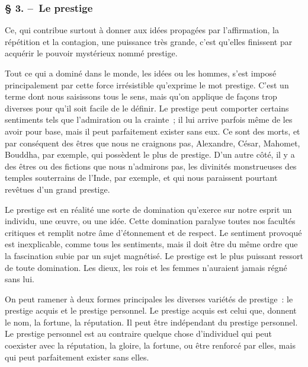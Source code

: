 \documentclass[french,twoside]{book} %
\begin{document}
\subsubsection[{§ 3. – Le prestige}]{§ 3. – Le prestige}
\noindent Ce, qui contribue surtout à donner aux idées propagées par l’affirmation, la répéti­tion et la contagion, une puissance très grande, c’est qu’elles finissent par acquérir le pouvoir mystérieux nommé prestige.\par
Tout ce qui a dominé dans le monde, les idées ou les hommes, s’est imposé principalement par cette force irrésistible qu’exprime le mot prestige. C’est un terme dont nous saisissons tous le sens, mais qu’on applique de façons trop diverses pour qu’il soit facile de le définir. Le prestige peut comporter certains sentiments tels que l’admiration ou la crainte ; il lui arrive parfois même de les avoir pour base, mais il peut parfaitement exister sans eux. Ce sont des morts, et par conséquent des êtres que nous ne craignons pas, Alexandre, César, Mahomet, Bouddha, par exemple, qui possèdent le plus de prestige. D’un autre côté, il y a des êtres ou des fictions que nous n’admirons pas, les divinités monstrueuses des temples souterrains de l’Inde, par exemple, et qui nous paraissent pourtant revêtues d’un grand prestige.\par
Le prestige est en réalité une sorte de domination qu’exerce sur notre esprit un individu, une œuvre, ou une idée. Cette domination paralyse toutes nos facultés criti­ques et remplit notre âme d’étonnement et de respect. Le sentiment provoqué est inexplicable, comme tous les sentiments, mais il doit être du même ordre que la fasci­nation subie par un sujet magnétisé. Le prestige est le plus puissant ressort de toute domination. Les dieux, les rois et les femmes n’auraient jamais régné sans lui.\par
On peut ramener à deux formes principales les diverses variétés de prestige : le prestige acquis et le prestige personnel. Le prestige acquis est celui que, donnent le nom, la fortune, la réputation. Il peut être indépendant du prestige personnel. Le pres­tige personnel est au contraire quelque chose d’individuel qui peut coexister avec la réputation, la gloire, la fortune, ou être renforcé par elles, mais qui peut parfaitement exister sans elles.\par
\end{document}
